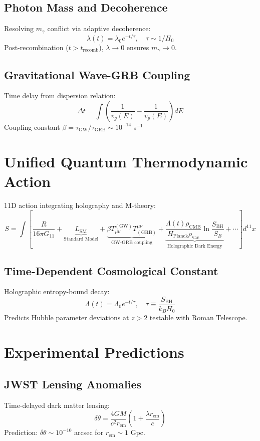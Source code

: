 \documentclass[12pt,a4paper]{article}
\begin{document}
\subsection{Photon Mass and Decoherence}
Resolving $m_\gamma$ conflict via adaptive decoherence:
\[
\lambda(t) = \lambda_0 e^{-t/\tau},\quad \tau \sim 1/H_0
\]
Post-recombination ($t > t_{\text{recomb}}$), $\lambda \to 0$ ensures $m_\gamma \to 0$.

\subsection{Gravitational Wave-GRB Coupling}
Time delay from dispersion relation:
\[
\Delta t = \int \left( \frac{1}{v_g(E)} - \frac{1}{v_p(E)} \right) dE
\]
Coupling constant $\beta = \tau_{\text{GW}}/\tau_{\text{GRB}} \sim 10^{-14}$ s$^{-1}$

\section{Unified Quantum Thermodynamic Action}
11D action integrating holography and M-theory:
\[
S = \int \left[ \frac{R}{16\pi G_{11}} + \underbrace{L_{\text{SM}}}_{\text{Standard Model}} + \underbrace{\beta T_{\mu\nu}^{(\text{GW})} T^{\mu\nu}_{(\text{GRB})}}_{\text{GW-GRB coupling}} + \underbrace{\frac{\Lambda(t)\rho_{\text{CMB}}}{H_{\text{Planck}}\rho_{\text{vac}}} \ln\frac{S_{\text{BH}}}{S_B}}_{\text{Holographic Dark Energy}} + \cdots \right] d^{11}x
\]

\subsection{Time-Dependent Cosmological Constant}
Holographic entropy-bound decay:
\[
\Lambda(t) = \Lambda_0 e^{-t/\tau},\quad \tau \equiv \frac{S_{\text{BH}}}{k_B H_0}
\]
Predicts Hubble parameter deviations at $z > 2$ testable with Roman Telescope.

\section{Experimental Predictions}

\subsection{JWST Lensing Anomalies}
Time-delayed dark matter lensing:
\[
\delta\theta = \frac{4GM}{c^2 r_{\text{em}}} \left(1 + \frac{\lambda r_{\text{em}}}{c}\right)
\]
Prediction: $\delta\theta \sim 10^{-10}$ arcsec for $r_{\text{em}} \sim 1$ Gpc.
\end{document}
